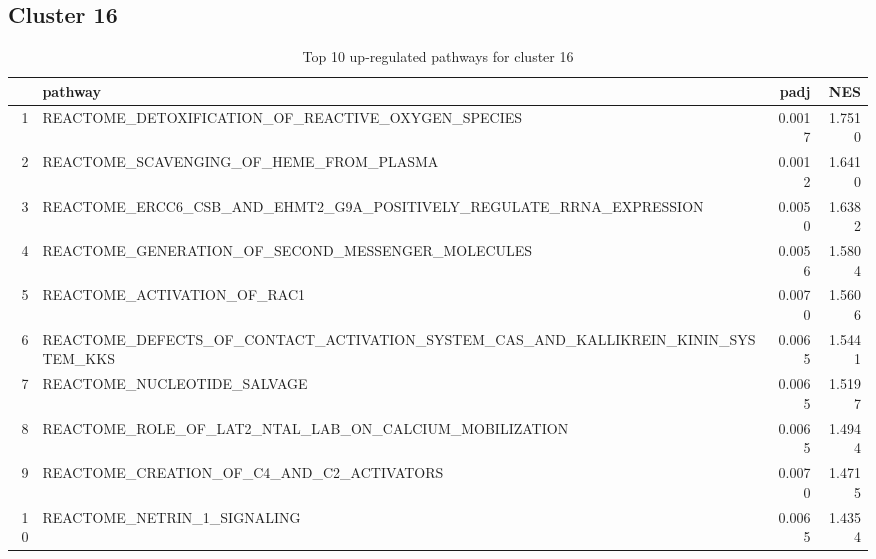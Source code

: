\documentclass{article}
\begin{document}
\subsection{Cluster 16 }
\begin{table}[H]
\centering
\begin{tabularx}{\textwidth}{rlrr}
  \hline
 & pathway & padj & NES \\ 
  \hline
1 & REACTOME\_DETOXIFICATION\_OF\_REACTIVE\_OXYGEN\_SPECIES & 0.0017 & 1.7510 \\ 
  2 & REACTOME\_SCAVENGING\_OF\_HEME\_FROM\_PLASMA & 0.0012 & 1.6410 \\ 
  3 & REACTOME\_ERCC6\_CSB\_AND\_EHMT2\_G9A\_POSITIVELY\_REGULATE\_RRNA\_EXPRESSION & 0.0050 & 1.6382 \\ 
  4 & REACTOME\_GENERATION\_OF\_SECOND\_MESSENGER\_MOLECULES & 0.0056 & 1.5804 \\ 
  5 & REACTOME\_ACTIVATION\_OF\_RAC1 & 0.0070 & 1.5606 \\ 
  6 & REACTOME\_DEFECTS\_OF\_CONTACT\_ACTIVATION\_SYSTEM\_CAS\_AND\_KALLIKREIN\_KININ\_SYSTEM\_KKS & 0.0065 & 1.5441 \\ 
  7 & REACTOME\_NUCLEOTIDE\_SALVAGE & 0.0065 & 1.5197 \\ 
  8 & REACTOME\_ROLE\_OF\_LAT2\_NTAL\_LAB\_ON\_CALCIUM\_MOBILIZATION & 0.0065 & 1.4944 \\ 
  9 & REACTOME\_CREATION\_OF\_C4\_AND\_C2\_ACTIVATORS & 0.0070 & 1.4715 \\ 
  10 & REACTOME\_NETRIN\_1\_SIGNALING & 0.0065 & 1.4354 \\ 
   \hline
\end{tabularx}
\caption{Top 10 up-regulated pathways for cluster 16} 
\label{tab:q3_2_16}
\end{table}
\end{document}
